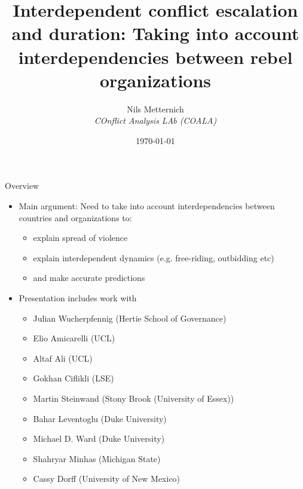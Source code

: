 \documentclass{beamer}
\begin{document}
\title[UCL]
{
Interdependent conflict escalation and duration: Taking into account interdependencies between rebel organizations}
\author[Santa Fe Workshop]
{
Nils Metternich\\
\footnotesize{\emph{COnflict Analysis LAb (COALA)}}
} 

\date{\today}

\begin{frame}
\titlepage
\end{frame}


\begin{frame}{Overview}
\begin{itemize}
\item Main argument: Need to take into account interdependencies between countries and organizations to:
\begin{itemize}
\item explain spread of violence 
\item explain interdependent dynamics (e.g. free-riding, outbidding etc)
\item and make accurate predictions
\end{itemize}
\item Presentation includes work with 
\begin{itemize}
\item Julian Wucherpfennig (Hertie School of Governance)
\item Elio Amicarelli (UCL)
\item Altaf Ali (UCL)
\item Gokhan Ciflikli (LSE)
\item Martin Steinwand (Stony Brook (University of Essex))
\item Bahar Leventoglu (Duke University)
\item Michael D. Ward (Duke University)
\item Shahryar Minhas (Michigan State)
\item Cassy Dorff (University of New Mexico)
\end{itemize}
\end{itemize}
\end{frame}
\end{document}
